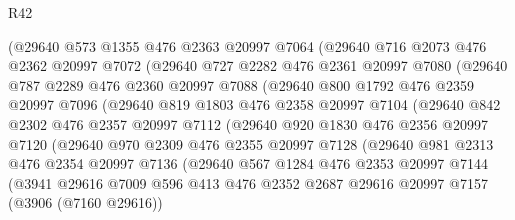 \begin{lexlean}{R42}
\begin{coremodule}
          (@29640
            @573
            @1355
            @476
            @2363
            @20997
            @7064
            (@29640
              @716
              @2073
              @476
              @2362
              @20997
              @7072
              (@29640
                @727
                @2282
                @476
                @2361
                @20997
                @7080
                (@29640
                  @787
                  @2289
                  @476
                  @2360
                  @20997
                  @7088
                  (@29640
                    @800
                    @1792
                    @476
                    @2359
                    @20997
                    @7096
                    (@29640
                      @819
                      @1803
                      @476
                      @2358
                      @20997
                      @7104
                      (@29640
                        @842
                        @2302
                        @476
                        @2357
                        @20997
                        @7112
                        (@29640
                          @920
                          @1830
                          @476
                          @2356
                          @20997
                          @7120
                          (@29640
                            @970
                            @2309
                            @476
                            @2355
                            @20997
                            @7128
                            (@29640
                              @981
                              @2313
                              @476
                              @2354
                              @20997
                              @7136
                              (@29640
                                @567
                                @1284
                                @476
                                @2353
                                @20997
                                @7144
                                (@3941
                                  @29616
                                  @7009
                                  @596
                                  @413
                                  @476
                                  @2352
                                  @2687
                                  @29616
                                  @20997
                                  @7157
                                  (@3906 (@7160 @29616))

\end{coremodule}
\end{lexlean}
